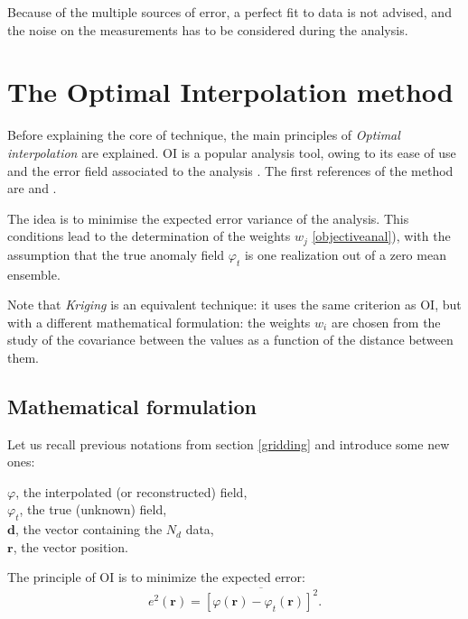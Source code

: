 Because of the multiple sources of error, a perfect fit to data is not advised, and the noise on the measurements has to be considered during the analysis.

\section{The Optimal Interpolation method\label{sec:OImethod}}
 
Before explaining the core of \diva technique, the main principles of \textit{Optimal interpolation} \citep[OI,][]{STOR99,CHILES99} are explained. OI is a popular analysis tool, owing to its ease of use and the error field associated to the analysis \citep[e.g.,][]{SHEN98b,KAPLAN00}. The first references of the method are \citet{GANDIN65} and \citet{BRETHERTON76}.

The idea is to minimise the expected error variance of the analysis. This conditions lead to the determination of the weights $w_j$ \eqref{objectiveanal}), with the assumption that the true anomaly field $\varphi_t$ is one realization out of a zero mean ensemble. 

Note that \textit{Kriging} \citep{KRIGE51,MATHERON63} is an equivalent technique: it uses the same criterion as OI, but with a different mathematical formulation: the weights $w_{i}$ are chosen from the study of the covariance between the values as a function of the distance between them.

\subsection{Mathematical formulation}

Let us recall previous notations from section \ref{gridding} and introduce some new ones:

$\varphi$, the interpolated (or reconstructed) field,\\
$\varphi_{t}$, the true (unknown) field,\\
$\mathbf{d}$, the vector containing the $N_{d}$ data,\\
$\mathbf{r}$, the vector position.

The principle of OI is to minimize the expected error:
\begin{equation}
e^{2}(\mathbf{r}) = \overline{[\varphi(\mathbf{r})-\varphi_{t}(\mathbf{r})]^{2}}.
\end{equation}


